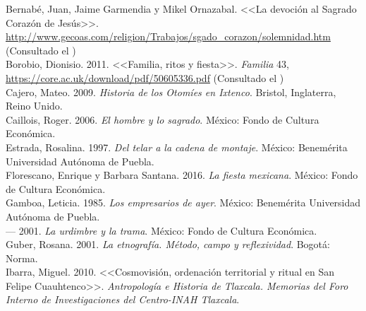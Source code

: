 \documentclass[14pt,letterpaper,twoside]{extbook} %
\begin{document}
\noindent Bernabé, Juan, Jaime Garmendia y Mikel Ornazabal. <<La devoción al Sagrado Corazón de Jesús>>. \url{http://www.gecoas.com/religion/Trabajos/sgado_corazon/solemnidad.htm} (Consultado el ) \\

\noindent Borobio, Dionisio. 2011. <<Familia, ritos y fiesta>>. \textit{Familia} 43, \url{https://core.ac.uk/download/pdf/50605336.pdf} (Consultado el ) \\

\noindent Cajero, Mateo. 2009. \textit{Historia de los Otomíes en Ixtenco}. Bristol, Inglaterra, Reino Unido. \\ %

\noindent Caillois, Roger. 2006. \textit{El hombre y lo sagrado}. México: Fondo de Cultura Económica.\\

\noindent Estrada, Rosalina. 1997. \textit{Del telar a la cadena de montaje}. México: Benemérita Universidad Autónoma de Puebla.\\

\noindent Florescano, Enrique y Barbara Santana. 2016. \textit{La fiesta mexicana}. México: Fondo de Cultura Económica.\\

\noindent Gamboa, Leticia. 1985. \textit{Los empresarios de ayer}. México: Benemérita Universidad Autónoma de Puebla.\\

\noindent --- 2001. \textit{La urdimbre y la trama}. México: Fondo de Cultura Económica.\\

\noindent Guber, Rosana. 2001. \textit{La etnografía. Método, campo y reflexividad}. Bogotá: Norma.\\

\noindent Ibarra, Miguel. 2010. <<Cosmovisión, ordenación territorial y ritual en San Felipe Cuauhtenco>>. \textit{Antropología e Historia de Tlaxcala. Memorias del Foro Interno de Investigaciones del Centro-INAH Tlaxcala}. \\ %
\end{document}
